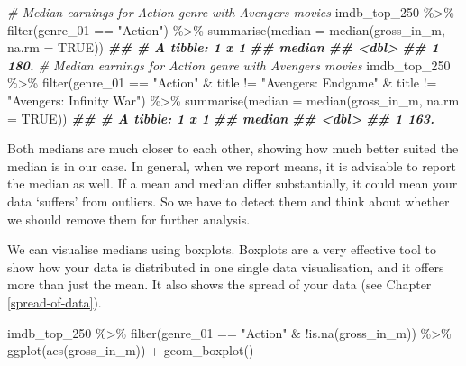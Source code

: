 \documentclass[
]{book}
\newenvironment{Shaded}{\begin{snugshade}}{\end{snugshade}}
\newcommand{\AttributeTok}[1]{\textcolor[rgb]{0.77,0.63,0.00}{#1}}
\newcommand{\CommentTok}[1]{\textcolor[rgb]{0.56,0.35,0.01}{\textit{#1}}}
\newcommand{\ConstantTok}[1]{\textcolor[rgb]{0.00,0.00,0.00}{#1}}
\newcommand{\DocumentationTok}[1]{\textcolor[rgb]{0.56,0.35,0.01}{\textbf{\textit{#1}}}}
\newcommand{\FunctionTok}[1]{\textcolor[rgb]{0.00,0.00,0.00}{#1}}
\newcommand{\NormalTok}[1]{#1}
\newcommand{\SpecialCharTok}[1]{\textcolor[rgb]{0.00,0.00,0.00}{#1}}
\newcommand{\StringTok}[1]{\textcolor[rgb]{0.31,0.60,0.02}{#1}}
\begin{document}
\begin{Shaded}
\begin{Highlighting}[]
\CommentTok{\# Median earnings for Action genre with Avengers movies}
\NormalTok{imdb\_top\_250 }\SpecialCharTok{\%\textgreater{}\%}
  \FunctionTok{filter}\NormalTok{(genre\_01 }\SpecialCharTok{==} \StringTok{"Action"}\NormalTok{) }\SpecialCharTok{\%\textgreater{}\%}
  \FunctionTok{summarise}\NormalTok{(}\AttributeTok{median =} \FunctionTok{median}\NormalTok{(gross\_in\_m, }\AttributeTok{na.rm =} \ConstantTok{TRUE}\NormalTok{))}
\DocumentationTok{\#\# \# A tibble: 1 x 1}
\DocumentationTok{\#\#   median}
\DocumentationTok{\#\#    \textless{}dbl\textgreater{}}
\DocumentationTok{\#\# 1   180.}
\CommentTok{\# Median earnings for Action genre with Avengers movies}
\NormalTok{imdb\_top\_250 }\SpecialCharTok{\%\textgreater{}\%}
  \FunctionTok{filter}\NormalTok{(genre\_01 }\SpecialCharTok{==} \StringTok{"Action"} \SpecialCharTok{\&}
\NormalTok{           title }\SpecialCharTok{!=} \StringTok{"Avengers: Endgame"} \SpecialCharTok{\&}
\NormalTok{           title }\SpecialCharTok{!=} \StringTok{"Avengers: Infinity War"}\NormalTok{) }\SpecialCharTok{\%\textgreater{}\%}
  \FunctionTok{summarise}\NormalTok{(}\AttributeTok{median =} \FunctionTok{median}\NormalTok{(gross\_in\_m, }\AttributeTok{na.rm =} \ConstantTok{TRUE}\NormalTok{))}
\DocumentationTok{\#\# \# A tibble: 1 x 1}
\DocumentationTok{\#\#   median}
\DocumentationTok{\#\#    \textless{}dbl\textgreater{}}
\DocumentationTok{\#\# 1   163.}
\end{Highlighting}
\end{Shaded}

Both medians are much closer to each other, showing how much better suited the median is in our case. In general, when we report means, it is advisable to report the median as well. If a mean and median differ substantially, it could mean your data `suffers' from outliers. So we have to detect them and think about whether we should remove them for further analysis.

We can visualise medians using boxplots. Boxplots are a very effective tool to show how your data is distributed in one single data visualisation, and it offers more than just the mean. It also shows the spread of your data (see Chapter \ref{spread-of-data}).

\begin{Shaded}
\begin{Highlighting}[]
\NormalTok{imdb\_top\_250 }\SpecialCharTok{\%\textgreater{}\%}
  \FunctionTok{filter}\NormalTok{(genre\_01 }\SpecialCharTok{==} \StringTok{"Action"} \SpecialCharTok{\&} \SpecialCharTok{!}\FunctionTok{is.na}\NormalTok{(gross\_in\_m)) }\SpecialCharTok{\%\textgreater{}\%}
  \FunctionTok{ggplot}\NormalTok{(}\FunctionTok{aes}\NormalTok{(gross\_in\_m)) }\SpecialCharTok{+}
  \FunctionTok{geom\_boxplot}\NormalTok{()}
\end{Highlighting}
\end{Shaded}
\end{document}
